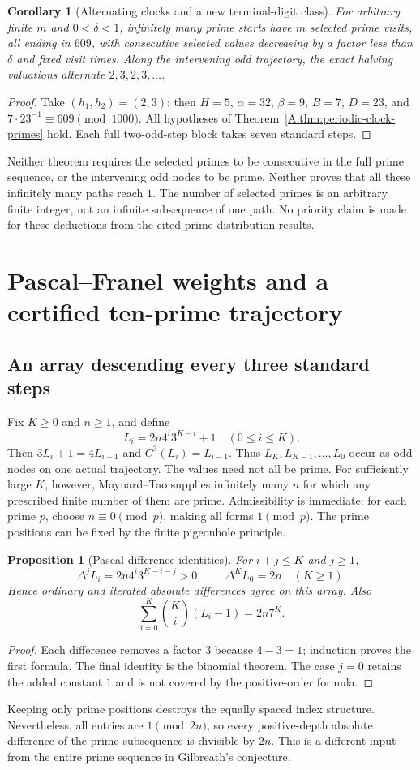 \documentclass[11pt,a4paper]{article}
\newtheorem{proposition}[theorem]{Proposition}
\newtheorem{corollary}[theorem]{Corollary}
\theoremstyle{definition}
\theoremstyle{remark}
\numberwithin{equation}{section}
\begin{document}
\begin{corollary}[Alternating clocks and a new terminal-digit class]
For arbitrary finite $m$ and $0<\delta<1$, infinitely many prime starts
have $m$ selected prime visits, all ending in $609$, with consecutive
selected values decreasing by a factor less than $\delta$ and fixed
visit times. Along the intervening odd trajectory, the exact halving
valuations alternate $2,3,2,3,\ldots$.
\end{corollary}
\begin{proof}
Take $(h_1,h_2)=(2,3)$: then $H=5$, $\alpha=32$, $\beta=9$,
$B=7$, $D=23$, and $7\cdot23^{-1}\equiv609\pmod{1000}$.
All hypotheses of Theorem~\ref{A:thm:periodic-clock-primes} hold.
Each full two-odd-step block takes seven standard steps.
\end{proof}

Neither theorem requires the selected primes to be consecutive in the
full prime sequence, or the intervening odd nodes to be prime. Neither
proves that all these infinitely many paths reach $1$. The number of
selected primes is an arbitrary finite integer, not an infinite
subsequence of one path. No priority claim is made for these deductions
from the cited prime-distribution results.

\section{Pascal--Franel weights and a certified ten-prime trajectory}
\label{A:sec:bridges}
\subsection{An array descending every three standard steps}
Fix $K\ge0$ and $n\ge1$, and define
\[
 L_i=2n4^i3^{K-i}+1\quad(0\le i\le K).
\]
Then $3L_i+1=4L_{i-1}$ and $C^3(L_i)=L_{i-1}$. Thus
$L_K,L_{K-1},\ldots,L_0$ occur as odd nodes on one actual trajectory.
The values need not all be prime. For sufficiently large $K$, however,
Maynard--Tao supplies infinitely many $n$ for which any prescribed
finite number of them are prime. Admissibility is immediate: for each
prime $p$, choose $n\equiv0\pmod p$, making all forms $1\pmod p$.
The prime positions can be fixed by the finite pigeonhole principle.

\begin{proposition}[Pascal difference identities]
For $i+j\le K$ and $j\ge1$,
\[
 \Delta^jL_i=2n4^i3^{K-i-j}>0,\qquad
 \Delta^KL_0=2n\quad(K\ge1).
\]
Hence ordinary and iterated absolute differences agree on this array.
Also
\[
 \sum_{i=0}^K\binom Ki(L_i-1)=2n7^K.
\]
\end{proposition}
\begin{proof}
Each difference removes a factor $3$ because $4-3=1$; induction proves
the first formula. The final identity is the binomial theorem.
The case $j=0$ retains the added constant $1$ and is not covered by the
positive-order formula.
\end{proof}
Keeping only prime positions destroys the equally spaced index
structure. Nevertheless, all entries are $1\pmod{2n}$, so every
positive-depth absolute difference of the prime subsequence is divisible
by $2n$. This is a different input from the entire prime sequence in
Gilbreath's conjecture.
\end{document}
